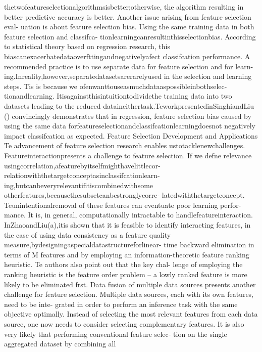 thetwofeatureselectionalgorithmsisbetter;otherwise,
the algorithm resulting in better predictive accuracy is
better.
Another issue arising from feature selection eval-
uation is about feature selection bias. 
Using the same
training data in both feature selection and classifca-
tionlearningcanresultinthisselectionbias.
According
to statistical theory based on regression research, this
biascanexacerbatedataoverfttingandnegativelyafect
classifcation performance. 
A recommended practice is
to use separate data for feature selection and for learn-
ing.Inreality,however,separatedatasetsarerarelyused
in the selection and learning steps. 
Tis is because we
ofenwanttouseasmuchdataaspossibleinbothselec-
tionandlearning.
Itisagainstthisintuitiontodividethe
training data into two datasets leading to the reduced
dataineithertask.TeworkpresentedinSinghiandLiu
() convincingly demonstrates that in regression,
feature selection bias caused by using the same data
forfeatureselectionandclassifcationlearningdoesnot
negatively impact classifcation as expected.
Feature Selection Development and Applications
Te advancement of feature selection research enables
ustotacklenewchallenges.
Featureinteractionpresents
a challenge to feature selection. 
If we defne relevance
usingcorrelation,afeaturebyitselfmighthavelittlecor-
relationwiththetargetconceptasinclassifcationlearn-
ing,butcanbeveryrelevantifitiscombinedwithsome
otherfeatures,becausethesubsetcanbestronglycorre-
latedwiththetargetconcept.
Teunintentionalremoval
of these features can eventuate poor learning perfor-
mance. It is, in general, computationally intractable to
handlefeatureinteraction.
InZhaoandLiu(a),itis
shown that it is feasible to identify interacting features,
in the case of using data consistency as a feature quality
measure,bydesigningaspecialdatastructureforlinear-
time backward elimination in terms of M features and
by employing an information-theoretic feature ranking
heuristic. 
Te authors also point out that the key chal-
lenge of employing the ranking heuristic is the feature
order problem – a lowly ranked feature is more likely to
be eliminated frst.
Data fusion of multiple data sources presents
another challenge for feature selection. 
Multiple data
sources, each with its own features, need to be inte-
grated in order to perform an inference task with the
same objective optimally. 
Instead of selecting the most
relevant features from each data source, one now needs
to consider selecting complementary features. 
It is also
very likely that performing conventional feature selec-
tion on the single aggregated dataset by combining all
